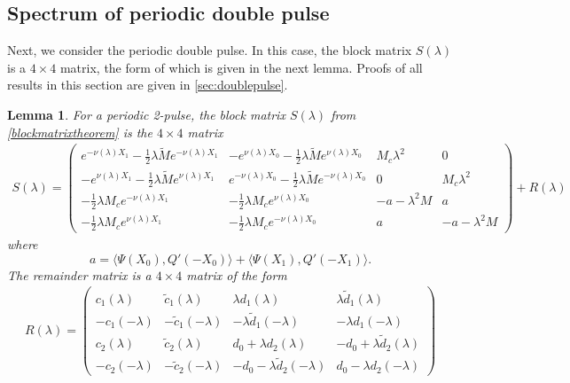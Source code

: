 \documentclass[10pt,reqno]{amsart}
\theoremstyle{plain}
\newtheorem{lemma}[theorem]{Lemma}
\theoremstyle{definition}
\theoremstyle{remark}
\numberwithin{theorem}{section}
\numberwithin{equation}{section}
\begin{document}
\subsection{Spectrum of periodic double pulse}\label{sec:perdouble}

Next, we consider the periodic double pulse. In this case, the block matrix $S(\lambda)$ is a $4\times 4$ matrix, the form of which is given in the next lemma. Proofs of all results in this section are given in \cref{sec:doublepulse}. 

\begin{lemma}\label{lemma:2blockmatrix}
For a periodic 2-pulse, the block matrix $S(\lambda)$ from \cref{blockmatrixtheorem} is the $4 \times 4$ matrix
\begin{align}\label{dpSmatrix}
S(\lambda) = 
\begin{pmatrix}
e^{-\nu(\lambda)X_1} -\frac{1}{2}\lambda \tilde{M} e^{-\nu(\lambda)X_1} & -e^{\nu(\lambda)X_0} -\frac{1}{2}\lambda \tilde{M} e^{\nu(\lambda)X_0} & M_c \lambda^2 & 0 \\
-e^{\nu(\lambda)X_1} -\frac{1}{2}\lambda \tilde{M} e^{\nu(\lambda)X_1} & e^{-\nu(\lambda)X_0} -\frac{1}{2}\lambda \tilde{M} e^{-\nu(\lambda)X_0} & 0 & M_c \lambda^2 \\
-\frac{1}{2}\lambda M_c e^{-\nu(\lambda)X_1} & -\frac{1}{2}\lambda M_c e^{\nu(\lambda)X_0} &-a-\lambda^2 M & a \\
-\frac{1}{2}\lambda M_c e^{\nu(\lambda)X_1} & -\frac{1}{2}\lambda M_c e^{-\nu(\lambda)X_0}  & a & -a-\lambda^2 M
\end{pmatrix} + R(\lambda)
\end{align}
where
\begin{equation}\label{2pa}
a = \langle \Psi(X_0), Q'(-X_0) \rangle + \langle \Psi(X_1), Q'(-X_1) \rangle.
\end{equation}
The remainder matrix is a $4 \times 4$ matrix of the form
\begin{align}
R(\lambda) = 
\begin{pmatrix} 
c_1(\lambda) & \tilde{c}_1(\lambda) & \lambda d_1(\lambda) & \lambda \tilde{d}_1(\lambda) \\ 
-c_1(-\lambda) & -\tilde{c}_1(-\lambda) & -\lambda \tilde{d}_1(-\lambda) & -\lambda d_1(-\lambda) \\ 
c_2(\lambda) & \tilde{c}_2(\lambda) & d_0 + \lambda d_2(\lambda) & -d_0 + \lambda \tilde{d}_2(\lambda) \\ 
-c_2(-\lambda) & -\tilde{c}_2(-\lambda) & -d_0 - \lambda \tilde{d}_2(-\lambda) & d_0 - \lambda d_2(-\lambda)

\end{pmatrix}
\end{align}
\end{lemma}
\end{document}
